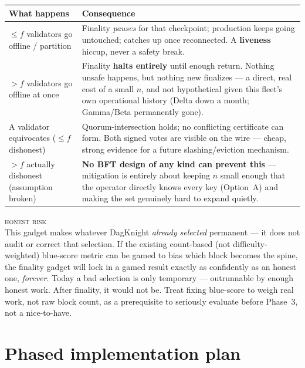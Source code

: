 \documentclass[10pt,a4paper]{article}
\newcommand{\warnbox}[1]{%
\begin{tcolorbox}[enhanced,
  interior style={left color=warn!8,right color=white},
  colframe=warn!55!slate,boxrule=0.5pt,arc=3pt,
  borderline west={2.5pt}{0pt}{warn},
  left=9pt,right=9pt,top=7pt,bottom=7pt]
{\scriptsize\textcolor{warn}{\textsc{honest risk}}}\\[3pt]
\small #1
\end{tcolorbox}}
\begin{document}
\begin{center}
\small
\begin{tabular}{@{}p{4.6cm}p{9.4cm}@{}}
\toprule
\textbf{What happens} & \textbf{Consequence} \\
\midrule
$\leq f$ validators go offline / partition & Finality \emph{pauses} for that checkpoint; production keeps
going untouched; catches up once reconnected. A \textbf{liveness} hiccup, never a safety break. \\
$> f$ validators go offline at once & Finality \textbf{halts entirely} until enough return. Nothing
unsafe happens, but nothing new finalizes — a direct, real cost of a small $n$, and not hypothetical
given this fleet's own operational history (Delta down a month; Gamma/Beta permanently gone). \\
A validator equivocates ($\leq f$ dishonest) & Quorum-intersection holds; no conflicting certificate can
form. Both signed votes are visible on the wire — cheap, strong evidence for a future slashing/eviction
mechanism. \\
$> f$ actually dishonest (assumption broken) & \textbf{No BFT design of any kind can prevent this} —
mitigation is entirely about keeping $n$ small enough that the operator directly knows every key
(Option~A) and making the set genuinely hard to expand quietly. \\
\bottomrule
\end{tabular}
\end{center}

\warnbox{This gadget makes whatever DagKnight \emph{already selected} permanent — it does not audit or
correct that selection. If the existing count-based (not difficulty-weighted) blue-score metric can be
gamed to bias which block becomes the spine, the finality gadget will lock in a gamed result exactly as
confidently as an honest one, \emph{forever}. Today a bad selection is only temporary — outrunnable by
enough honest work. After finality, it would not be. Treat fixing blue-score to weigh real work, not raw
block count, as a prerequisite to seriously evaluate before Phase~3, not a nice-to-have.}

\section{Phased implementation plan}
\end{document}
